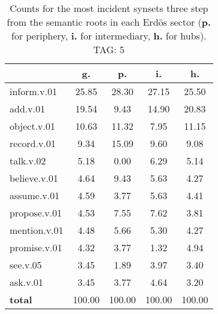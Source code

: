 \begin{table}[h!]
\begin{center}
\begin{tabular}{| l || c | c | c | c |}\hline
 & {\bf g.} & {\bf p.} & {\bf i.} & {\bf h.} \\\hline\hline
inform.v.01 & 25.85  & 28.30  & 27.15  & 25.50 \\\hline
add.v.01 & 19.54  & 9.43  & 14.90  & 20.83 \\\hline
object.v.01 & 10.63  & 11.32  & 7.95  & 11.15 \\\hline
record.v.01 & 9.34  & 15.09  & 9.60  & 9.08 \\\hline
talk.v.02 & 5.18  & 0.00  & 6.29  & 5.14 \\\hline
believe.v.01 & 4.64  & 9.43  & 5.63  & 4.27 \\\hline
assume.v.01 & 4.59  & 3.77  & 5.63  & 4.41 \\\hline
propose.v.01 & 4.53  & 7.55  & 7.62  & 3.81 \\\hline
mention.v.01 & 4.48  & 5.66  & 5.30  & 4.27 \\\hline
promise.v.01 & 4.32  & 3.77  & 1.32  & 4.94 \\\hline
see.v.05 & 3.45  & 1.89  & 3.97  & 3.40 \\\hline
ask.v.01 & 3.45  & 3.77  & 4.64  & 3.20 \\\hline\hline
{{\bf total}} & 100.00  & 100.00  & 100.00  & 100.00 \\\hline
\end{tabular}
\caption{Counts for the most incident synsets three step from the semantic roots in each Erd\"os sector ({\bf p.} for periphery, {\bf i.} for intermediary, {\bf h.} for hubs). TAG: 5}
\end{center}
\end{table}